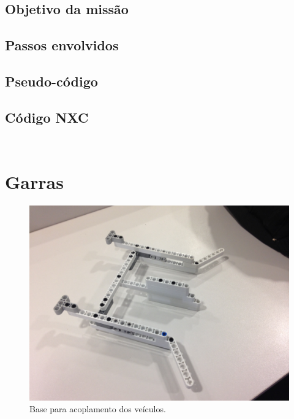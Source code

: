 \documentclass{article}
\begin{document}
	\subsection{Objetivo da missão}
	\subsection{Passos envolvidos}
	\subsection{Pseudo-código}
	\subsection{Código NXC}
		\begin{tcolorbox}[]
			\inputminted{c}{codes/the_bug_api.c}
		\end{tcolorbox}
		
		\begin{tcolorbox}[]
			\inputminted{c}{codes/the_bug_api.h}
		\end{tcolorbox}

\newpage
\section{Garras}
	\begin{figure}[h!]
		\includegraphics[width=\linewidth]{images/Garra_1.JPG}
		\caption{Base para acoplamento dos veículos.}
		\label{fig:claw_1}
	\end{figure}
\end{document}
